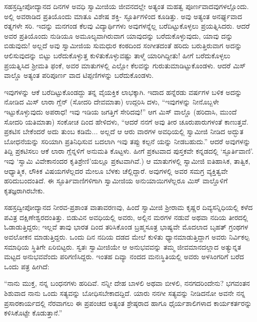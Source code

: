 ಸಹಸ್ರದ್ವೀಪೋದ್ಯಾನದ ದಿನಗಳ ಅವಧಿ ಸ್ವಾಮೀಜಿಯ ಜೀವನದಲ್ಲೇ ಅತ್ಯಂತ ಮಹತ್ವ ಪೂರ್ಣವಾದವುಗಳಲ್ಲೊಂದು. ಅಲ್ಲಿ ಅವರಾಡಿದ ಪ್ರತಿಯೊಂದು ಮಾತೂ ವಿಶೇಷ ಶಕ್ತಿ- ಸ್ಫೂರ್ತಿಗಳಿಂದ ಕೂಡಿತ್ತು. ಅವು ಅತ್ಯಂತ ಅನರ್ಘ್ಯವಾದ ರತ್ನಗಳೇ ಸರಿ. ಇದನ್ನು ಮನಗಂಡ ಕೆಲವು ವಿದ್ಯಾರ್ಥಿಗಳು ಅವುಗಳನ್ನೆಲ್ಲ ಬರೆದಿಟ್ಟುಕೊಳ್ಳಲು ಪ್ರಯತ್ನಿಸಿದರು. ಆದರೆ ಅವರ ಪ್ರತಿಯೊಂದು ನುಡಿಯೂ ಅಮೂಲ್ಯವಾಗಿರುವಾಗ ಯಾವುದನ್ನು ಬರೆದುಕೊಳ್ಳುವುದು, ಯಾವು ದನ್ನು ಬಿಡುವುದು! ಅಲ್ಲದೆ ಅವು ಸ್ವಾಮೀಜಿಯ ಸುಮಧುರ ಕಂಠದಿಂದ ಸಂಗೀತದಂತೆ ಹರಿದು ಬರುತ್ತಿರುವಾಗ ಅದನ್ನು ಆಲಿಸುವುದನ್ನು ಬಿಟ್ಟು ಬರೆದುಕೊಳ್ಳುತ್ತ ಕುಳಿತುಕೊಳ್ಳುವಷ್ಟು ತಾಳ್ಮೆ ಯಾರಿಗಿದ್ದೀತು! ಹೀಗೆ ಬರೆದುಕೊಳ್ಳಲು ಪ್ರಯತ್ನಿಸಿದ ಶ್ರೀಮತಿ ಫಂಕೆ, ಅವರ ಮಾತುಗಳಲ್ಲಿ ಎಲ್ಲೋ ಕೆಲವನ್ನು ಗುರುತುಮಾಡಿಟ್ಟುಕೊಂಡಳು. ಆದರೆ ಮಿಸ್ ವಾಲ್ಡೊ ಅತ್ಯಂತ ಪರಿಪೂರ್ಣ ವಾದ ಟಿಪ್ಪಣಿಗಳನ್ನು ಬರೆದುಕೊಂಡಳು.

ಇವುಗಳನ್ನು ಆಕೆ ಬರೆದಿಟ್ಟುಕೊಂಡದ್ದು ತನ್ನ ವೈಯಕ್ತಿಕ ಲಾಭಕ್ಕಾಗಿ. ಇದಾದ ಹನ್ನೆರಡು ವರ್ಷಗಳ ಬಳಿಕ ಅದನ್ನು ನೋಡಿದ ಮಿಸ್ ಲಾರಾ ಗ್ಲೆನ್ (ಸೋದರಿ ದೇವಮಾತಾ) ಉದ್ಗರಿಸಿ ದಳು, “ಇವುಗಳನ್ನು ನೀನೊಬ್ಬಳೇ ಇಟ್ಟುಕೊಳ್ಳುವುದು ಅಪರಾಧ! ಇವು ಇಡಿಯ ಜಗತ್ತಿಗೆ ಸೇರಿದವು!” ಆಗ ಮಿಸ್ ವಾಲ್ಡೊ (ಹರಿದಾಸಿ, ಮುಂದೆ ಸೋದರಿ ಯತಿಮಾತಾ) ಸಂಕೋಚ ದಿಂದ ಹೇಳಿದಳು, “ಆದರೆ ನನಗೆ ಅವು ತೀರ ಚೂರುಪಾರುಗಳಂತೆ ಕಾಣುತ್ತವೆ. ಪ್ರಕಟಿಸ ಬೇಕೆಂದರೆ ಅದು ತುಂಬ ಕಡಿಮೆ... ಅಲ್ಲದೆ ಆ ಆರು ವಾರಗಳ ಅವಧಿಯಲ್ಲಿ ಸ್ವಾಮೀಜಿ ನೀಡಿದ ಅದ್ಭುತ ಬೋಧನೆಯನ್ನು ಸರಿಯಾಗಿ ಪ್ರತಿನಿಧಿಸುವ ಬದಲಾಗಿ ಇವು ತಪ್ಪು ಕಲ್ಪನೆ ಯನ್ನು ನೀಡಬಹುದು.” ಆದರೆ ಅವುಗಳನ್ನು ತಿದ್ದಿ ಪ್ರಕಟಿಸಲು ಆಕೆ ಲಾರಾ ಗ್ಲೆನ್ನಳಿಗೆ ಅನುಮತಿ ಕೊಟ್ಟಳು. ಹೀಗೆ ಪ್ರಕಟವಾದ ಪುಸ್ತಕವೇ ಕನ್ನಡದಲ್ಲಿ ‘ಸ್ಫೂರ್ತಿವಾಣಿ’. ಇವು ‘ಸ್ವಾಮಿ ವಿವೇಕಾನಂದರ ಕೃತಿಶ್ರೇಣಿ’ಯಲ್ಲೂ ಪ್ರಕಟವಾಗಿವೆ.) ಆ ಮಾತುಗಳಲ್ಲಿ ಸ್ವಾಮೀಜಿ ಐತಿಹಾಸಿಕ, ತಾತ್ವಿಕ, ಆಧ್ಯಾತ್ಮಿಕ, ಲೌಕಿಕ ವಿಷಯಗಳೆಲ್ಲದರ ಮೇಲೂ ಬೆಳಕು ಚೆಲ್ಲಿದ್ದಾರೆ. ಅವುಗಳಲ್ಲಿ ಅವರ ಸಮಗ್ರ ವ್ಯಕ್ತಿತ್ವವೇ ಹರಿದುಬಂದಂತಿದೆ. ಈ ಸ್ಫೂರ್ತಿವಾಣಿಗಳಿಗಾಗಿ ಸ್ವಾಮೀಜಿಯ ಅನುಯಾಯಿಗಳೆಲ್ಲರೂ ಮಿಸ್ ವಾಲ್ಡೊಳಿಗೆ ಕೃತಜ್ಞರಾಗಿರಬೇಕು.

ಸಹಸ್ರದ್ವೀಪೋದ್ಯಾನದ ನೀರವ-ಪ್ರಶಾಂತ ವಾತಾವರಣವು, ಹಿಂದೆ ಸ್ವಾಮೀಜಿ ಶ್ರೀರಾಮ ಕೃಷ್ಣರ ದಿವ್ಯಸನ್ನಿಧಿಯಲ್ಲಿ ಕಳೆದ ಪವಿತ್ರ ದಕ್ಷಿಣೇಶ್ವರದಂತಿತ್ತು. ಬಿಡುವಿನ ಅವಧಿಯಲ್ಲಿ ಅವರು, ಅಲ್ಲಿನ ಮರಗಳ ನಡುವೆ ಅಥವಾ ನದಿಯ ತೀರದಲ್ಲಿ ಓಡಾಡುತ್ತಿದ್ದರು; ಇಲ್ಲವೆ ತಾವು ಭಾರತ ದಿಂದ ತರಿಸಿಕೊಂಡ ಬ್ರಹ್ಮಸೂತ್ರ ಭಾಷ್ಯವೇ ಮೊದಲಾದ ಬೃಹತ್ ಗ್ರಂಥಗಳ ಅವಲೋಕನ ಮಾಡುತ್ತಿದ್ದರು. ಒಂದು ದಿನ ನದಿಯ ದಡದ ಮೇಲೆ ಕುಳಿತು ಧ್ಯಾನಮಾಡುತ್ತಿದ್ದಾಗ ಅವರು ನಿರ್ವಿಕಲ್ಪ ಸಮಾಧಿಯ ಸ್ಥಿತಿಗೇ ಏರಿಬಿಟ್ಟರು. ಸ್ವತಃ ಸ್ವಾಮೀಜಿಯೇ ಆ ಅನುಭವವನ್ನು ತಮ್ಮ ಜೀವಮಾನದಲ್ಲಾದ ಅತ್ಯುನ್ನತ ಮಟ್ಟದ ಅನುಭವವೆಂದು ಪರಿಗಣಿಸಿದ್ದರು. ಇಂತಹ ದಿವ್ಯಾ ನಂದದ ಮನಃಸ್ಥಿತಿಯಲ್ಲಿ ಅವರು ಅಳಸಿಂಗರಿಗೆ ಬರೆದ ಒಂದು ಪತ್ರ ಹೀಗಿದೆ:

“ನಾನು ಮುಕ್ತ, ನನ್ನ ಬಂಧನಗಳು ಹರಿದಿವೆ. ನನ್ನೀ ದೇಹ ಬಾಳಲಿ ಅಥವಾ ಬೀಳಲಿ, ನನಗದರಿಂದೇನು? ಭಗವಂತನ ಶಿಶುವಾದ ನಾನು ಒಂದು ಸತ್ಯವನ್ನು ಬೋಧಿಸಬೇಕಾದದ್ದಿದೆ. ಯಾರು ನನಗೀ ಸತ್ಯವನ್ನು ನೀಡಿದನೋ ಅವನೇ ನನ್ನ ಪ್ರಸಾರಕಾರ್ಯದಲ್ಲಿ ನೆರವಾಗಲು ಈ ಪ್ರಪಂಚದ ಅತ್ಯಂತ ಶ್ರೇಷ್ಠರಾದ ಹಾಗೂ ಧೈರ್ಯಶಾಲಿಗಳಾದ ಕಾರ್ಯಕರ್ತರನ್ನು ಕಳಿಸಿಕೊಟ್ಟೇ ಕೊಡುತ್ತಾನೆ.”

